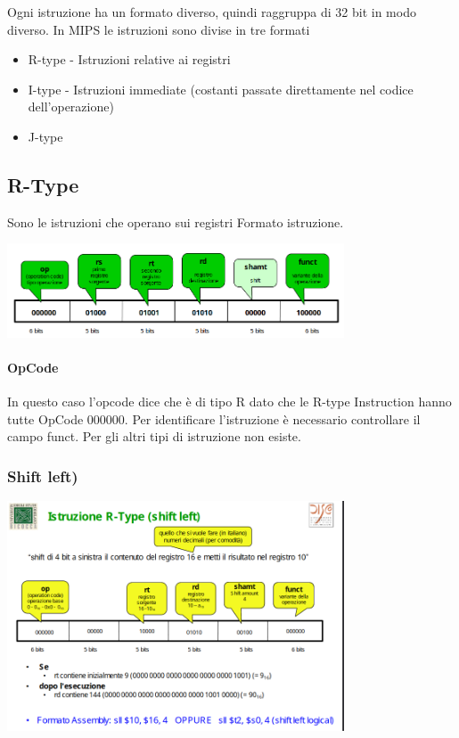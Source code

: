 \documentclass[12pt, a4paper, openany]{book}
\begin{document}
Ogni istruzione ha un formato diverso, quindi raggruppa di 32 bit in modo diverso.
In MIPS le istruzioni sono divise in tre formati
\begin{itemize}
    \item R-type - Istruzioni relative ai registri
    \item I-type - Istruzioni immediate (costanti passate direttamente nel codice dell'operazione)
    \item J-type
\end{itemize}

\subsection{R-Type}
Sono le istruzioni che operano sui registri
Formato istruzione.
\begin{center}
    \includegraphics[width=100mm, scale=0.5]{R-type format.png}
\end{center}
\paragraph*{OpCode} In questo caso l'opcode dice che è di tipo R dato che le R-type Instruction
hanno tutte OpCode 000000. Per identificare l'istruzione è necessario controllare il 
campo funct. Per gli altri tipi di istruzione non esiste.
\subsubsection*{Shift left)}
\begin{center}
    \includegraphics[width=100mm, scale=0.5]{Shift left.png}
\end{center}
\end{document}
